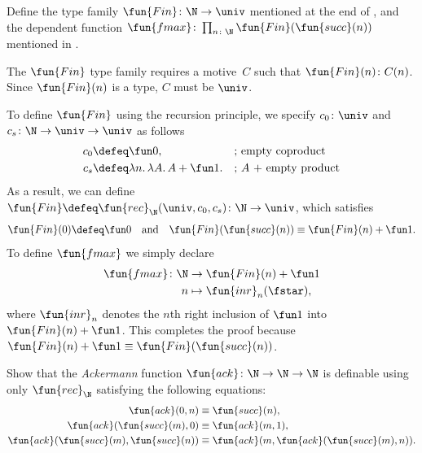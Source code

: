 \begin{exr}\label{exr:Fin}
    Define the type family\/ $\fun{Fin}\colon\N\to\univ$ mentioned at the end of {\upshape{}}, and the dependent function\/ $\fun{fmax}\colon\prod_{n\colon\N}\fun{Fin}(\fun{succ}(n))$ mentioned in {\upshape{}}.
\end{exr}

\begin{solution}
    The $\fun{Fin}$ type family requires a motive~$C$ such that $\fun{Fin}(n)\colon C(n)$. Since $\fun{Fin}(n)$ is a type, $C$ must be $\univ$.

    To define $\fun{Fin}$ using the recursion principle, we specify $c_0\colon\univ$ and $c_s\colon\N\to\univ\to\univ$ as follows
    \begin{align*}
        c_0&\defeq\fun0,
                &&\text{; empty coproduct}\\
        c_s&\defeq\lambda n.\,\lambda A.\,A+\fun1.
                &&\text{; $A$ + empty product}
    \end{align*}
    As a result, we can define $\fun{Fin}\defeq\fun{rec}_\N(\univ,c_0,c_s)\colon\N\to\univ$, which satisfies
    \[
        \fun{Fin}(0)\defeq\fun0
        \quad\text{and}\quad
        \fun{Fin}(\fun{succ}(n))\equiv\fun{Fin}(n)+\fun1.
    \]
     To define $\fun{fmax}$ we simply declare
    \begin{align*}
        \fun{fmax}\colon\N&\to\fun{Fin}(n)+\fun1\\
        n&\mapsto\fun{inr}_n(\fstar),
    \end{align*}
    where $\fun{inr}_n$ denotes the $n$th right inclusion of $\fun1$ into $\fun{Fin}(n)+\fun1$. This completes the proof because $\fun{Fin}(n)+\fun1\equiv\fun{Fin}(\fun{succ}(n))$.
    
\end{solution}

\begin{exr}
    Show that the \textsl{Ackermann} function\/ $\fun{ack}\colon\N\to\N\to\N$ is definable using only\/ $\fun{rec}_\N$ satisfying the following equations:
    \begin{align*}
        \fun{ack}(0,n)&\equiv\fun{succ}(n),\\
        \fun{ack}(\fun{succ}(m),0)
            &\equiv\fun{ack}(m,1),\\
        \fun{ack}(\fun{succ}(m),\fun{succ}(n))
            &\equiv\fun{ack}(m,\fun{ack}(\fun{succ}(m),n)).
    \end{align*}
\end{exr}

